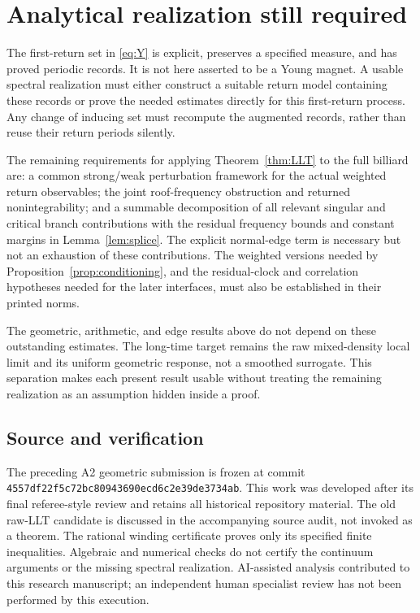 \section{Analytical realization still required}
The first-return set in \eqref{eq:Y} is explicit, preserves a specified measure, and has proved periodic records. It is not here asserted to be a Young magnet. A usable spectral realization must either construct a suitable return model containing these records or prove the needed estimates directly for this first-return process. Any change of inducing set must recompute the augmented records, rather than reuse their return periods silently.

The remaining requirements for applying Theorem~\ref{thm:LLT} to the full billiard are: a common strong/weak perturbation framework for the actual weighted return observables; the joint roof-frequency obstruction and returned nonintegrability; and a summable decomposition of all relevant singular and critical branch contributions with the residual frequency bounds and constant margins in Lemma~\ref{lem:splice}. The explicit normal-edge term is necessary but not an exhaustion of these contributions. The weighted versions needed by Proposition~\ref{prop:conditioning}, and the residual-clock and correlation hypotheses needed for the later interfaces, must also be established in their printed norms.

The geometric, arithmetic, and edge results above do not depend on these outstanding estimates. The long-time target remains the raw mixed-density local limit and its uniform geometric response, not a smoothed surrogate. This separation makes each present result usable without treating the remaining realization as an assumption hidden inside a proof.

\subsection*{Source and verification}
The preceding A2 geometric submission is frozen at commit
\texttt{4557df22f5c72bc80943690ecd6c2e39de3734ab}. This work was developed after its final referee-style review and retains all historical repository material. The old raw-LLT candidate is discussed in the accompanying source audit, not invoked as a theorem. The rational winding certificate proves only its specified finite inequalities. Algebraic and numerical checks do not certify the continuum arguments or the missing spectral realization. AI-assisted analysis contributed to this research manuscript; an independent human specialist review has not been performed by this execution.

